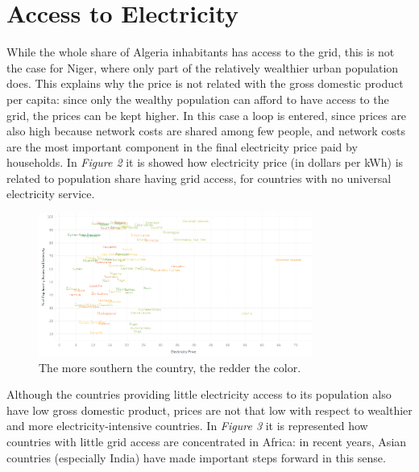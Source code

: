 \documentclass{book}
\begin{document}
\section{Access to Electricity}

While the whole share of Algeria inhabitants has access to the grid, this is not the case for Niger, where only part of the relatively wealthier urban population does. This explains why the price is not related with the gross domestic product per capita: since only the wealthy population can afford to have access to the grid, the prices can be kept higher. In this case a loop is entered, since prices are also high because network costs are shared among few people, and network costs are the most important component in the final electricity price paid by households. In \textit{Figure 2} it is showed how electricity price (in dollars per kWh) is related to population share having grid access, for countries with no universal electricity service.

\bigskip
\begin{figure}[H]
\begin{center}
\captionsetup{justification=centering}
\includegraphics[width=0.8\textwidth]{Images/accessNAMES.png}
\caption{The more southern the country, the redder the color. }
\end{center}
\end{figure}
\bigskip

Although the countries providing little electricity access to its population also have low gross domestic product, prices are not that low with respect to wealthier and more electricity-intensive countries. In \textit{Figure 3} it is represented how countries with little grid access are concentrated in Africa: in recent years, Asian countries (especially India) have made important steps forward in this sense.
\end{document}
